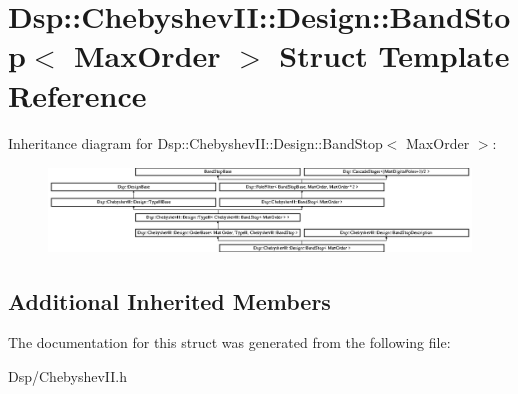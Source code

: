 \hypertarget{structDsp_1_1ChebyshevII_1_1Design_1_1BandStop}{\section{Dsp\-:\-:Chebyshev\-I\-I\-:\-:Design\-:\-:Band\-Stop$<$ Max\-Order $>$ Struct Template Reference}
\label{structDsp_1_1ChebyshevII_1_1Design_1_1BandStop}
}
Inheritance diagram for Dsp\-:\-:Chebyshev\-I\-I\-:\-:Design\-:\-:Band\-Stop$<$ Max\-Order $>$\-:\begin{figure}[H]
\begin{center}
\leavevmode
\includegraphics[height=2.262626cm]{structDsp_1_1ChebyshevII_1_1Design_1_1BandStop}
\end{center}
\end{figure}
\subsection*{Additional Inherited Members}


The documentation for this struct was generated from the following file\-:\begin{DoxyCompactItemize}
\item 
Dsp/Chebyshev\-I\-I.\-h\end{DoxyCompactItemize}
